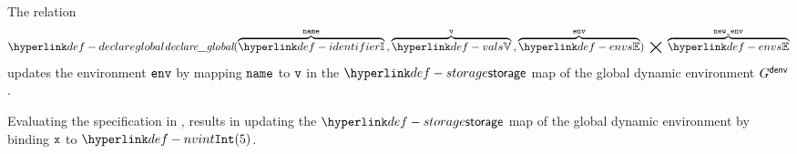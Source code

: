 \ProseParagraph
The relation
\hypertarget{def-declareglobal}{}
\[
  \declareglobal(\overname{\Identifiers}{\name} \aslsep \overname{\vals}{\vv} \aslsep \overname{\envs}{\env}) \;\aslrel\; \overname{\envs}{\newenv}
\]
updates the environment $\env$ by mapping $\name$ to $\vv$ in the $\storage$ map of the global dynamic environment $G^\denv$.

Evaluating the specification in , results in updating the $\storage$ map
of the global dynamic environment by binding $\vx$ to $\nvint(5)$.

\FormallyParagraph
\begin{mathpar}
\end{mathpar}
